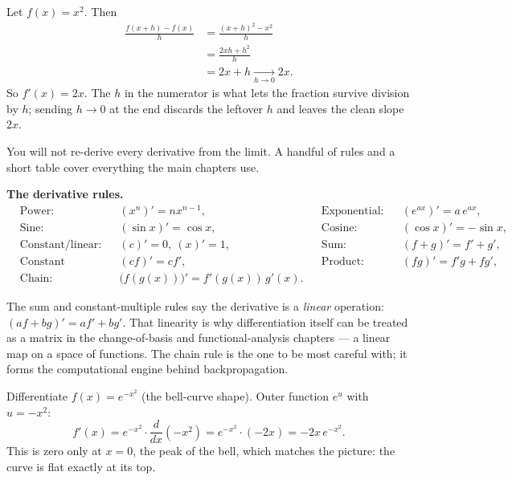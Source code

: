 \begin{example}
\label{ch39:ex-deriv}
Let $f(x) = x^2$. Then
\begin{align*}
\frac{f(x+h)-f(x)}{h} &= \frac{(x+h)^2 - x^2}{h} \\
&= \frac{2xh + h^2}{h} \\
&= 2x + h \xrightarrow[h\to 0]{} 2x.
\end{align*}
So $f'(x) = 2x$. The $h$ in the numerator is what lets the fraction survive division by $h$; sending
$h\to 0$ at the end discards the leftover $h$ and leaves the clean slope $2x$.
\end{example}

You will not re-derive every derivative from the limit. A handful of rules and a short table cover
everything the main chapters use.

\begin{formalbox}
\textbf{The derivative rules.}
\setlength{\arraycolsep}{3pt}
\begin{align*}
&\text{Power:} && (x^n)' = n x^{n-1}, & &\text{Exponential:} && (e^{ax})' = a\,e^{ax},\\
&\text{Sine:} && (\sin x)' = \cos x, & &\text{Cosine:} && (\cos x)' = -\sin x,\\
&\text{Constant/linear:} && (c)' = 0,\ (x)' = 1, & &\text{Sum:} && (f+g)' = f' + g',\\
&\text{Constant multiple:} && (cf)' = c f', & &\text{Product:} && (fg)' = f'g + fg',\\
&\text{Chain:} && \bigl(f(g(x))\bigr)' = f'(g(x))\,g'(x). & & &&
\end{align*}
\end{formalbox}

The sum and constant-multiple rules say the derivative is a \emph{linear} operation: $(af + bg)' = af'
+ bg'$. That linearity is why differentiation itself can be treated as a matrix in the
change-of-basis and functional-analysis chapters --- a linear map on a space of functions. The chain
rule is the one to be most careful with; it forms the computational engine behind backpropagation.

\begin{example}
\label{ch39:ex-chain}
Differentiate $f(x) = e^{-x^2}$ (the bell-curve shape). Outer function $e^{u}$ with $u = -x^2$:
\[
f'(x) = e^{-x^2}\cdot\frac{d}{dx}(-x^2) = e^{-x^2}\cdot(-2x) = -2x\,e^{-x^2}.
\]
This is zero only at $x = 0$, the peak of the bell, which matches the picture: the curve is flat
exactly at its top.
\end{example}

